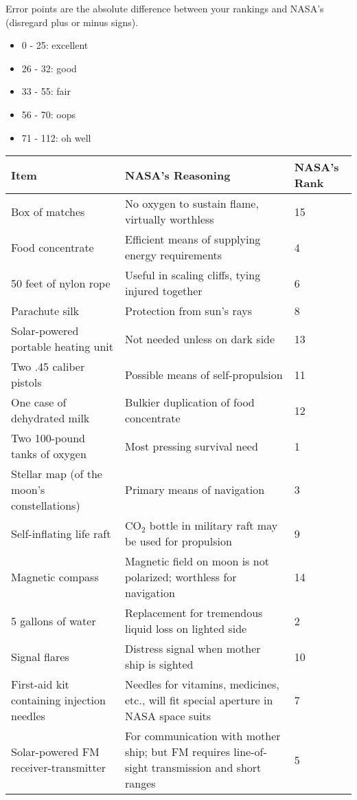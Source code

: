 \begin{solution}
Error points are the absolute difference between your rankings and
NASA's (disregard plus or minus signs).
\begin{itemize}
    \item 0 - 25: excellent
    \item 26 - 32: good
    \item 33 - 55: fair
    \item 56 - 70: oops
    \item 71 - 112: oh well
\end{itemize}

\clearpage

\begin{center}
    \begin{tabular}{|>{\raggedright}p{4cm}|p{8cm}|m{1.5cm}|}
        \hline
        Item & NASA's Reasoning & NASA's Rank \\ \hline
        Box of matches & No oxygen to sustain flame, virtually worthless &
        15 \\ \hline
        Food concentrate & Efficient means of supplying energy requirements
        & 4 \\ \hline
        50 feet of nylon rope & Useful in scaling cliffs, tying injured
        together & 6 \\ \hline
        Parachute silk & Protection from sun's rays & 8 \\ \hline
        Solar-powered portable heating unit & Not needed unless on dark
        side & 13 \\ \hline
        Two .45 caliber pistols & Possible means of self-propulsion & 11 \\
        \hline
        One case of dehydrated milk & Bulkier duplication of food concentrate &
        12 \\ \hline
        Two 100-pound tanks of oxygen & Most pressing survival need & 1 \\
        \hline
        Stellar map (of the moon's constellations)  & Primary means of
        navigation & 3 \\ \hline
        Self-inflating life raft & $\text{CO}_2$ bottle in military raft may be used
        for propulsion & 9 \\ \hline
        Magnetic compass & Magnetic field on moon is not polarized;
        worthless for navigation & 14 \\ \hline
        5 gallons of water & Replacement for tremendous liquid loss on
        lighted side & 2 \\ \hline
        Signal flares & Distress signal when mother ship is sighted & 10 \\
        \hline
        First-aid kit containing injection needles & Needles for vitamins, medicines,
        etc., will fit special aperture in NASA space suits & 7 \\ \hline
        Solar-powered FM receiver-transmitter & For communication with
        mother ship; but FM requires line-of-sight transmission and short
        ranges & 5 \\ \hline
    \end{tabular}
\end{center}

\end{solution}
